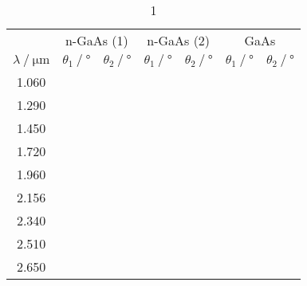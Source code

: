 \begin{table}
    \centering
    \caption{1}
    \begin{tabular}{c c c c c c c }
        \toprule
        & \multicolumn{2}{c}{n-GaAs (1)} & \multicolumn{2}{c}{n-GaAs (2)} & \multicolumn{2}{c}{GaAs} \\
		\cmidrule(lr){2-3}\cmidrule(lr){4-5}\cmidrule{6-7}
		{$\lambda \mathbin{/} \unit{\micro\meter}$} &
        {$\theta_1 \mathbin{/} \unit{\degree}$} & {$\theta_2 \mathbin{/} \unit{\degree}$} &
        {$\theta_1 \mathbin{/} \unit{\degree}$} & {$\theta_2 \mathbin{/} \unit{\degree}$} &
        {$\theta_1 \mathbin{/} \unit{\degree}$} & {$\theta_2 \mathbin{/} \unit{\degree}$} \\
		\midrule
        1.060&  &   &   &   &   &   \\
        1.290&  &   &   &   &   &   \\
        1.450&  &   &   &   &   &   \\
        1.720&  &   &   &   &   &   \\
        1.960&  &   &   &   &   &   \\
        2.156&  &   &   &   &   &   \\
        2.340&  &   &   &   &   &   \\
        2.510&  &   &   &   &   &   \\
        2.650&  &   &   &   &   &   \\
        \bottomrule
    \end{tabular}
    \label{tab:BFeld}
\end{table}


